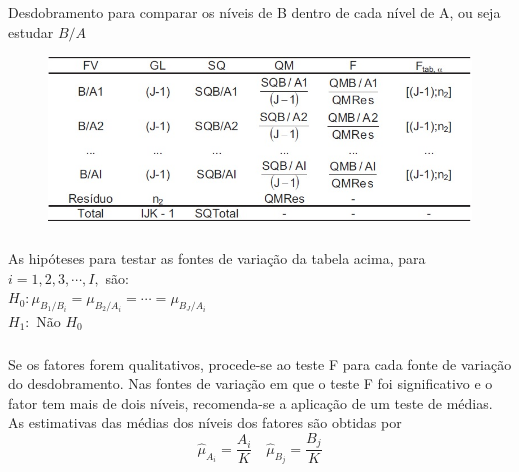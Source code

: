 \documentclass[14pt,aspectratio=1610]{beamer}
\begin{document}
\begin{frame}{}
\frametitle{}
\begin{block}{}
\justifying
Desdobramento para comparar os níveis de B dentro de cada nível de A,
ou seja estudar $B/A$
\begin{figure}[H]
    \centering
    \includegraphics[scale=0.5]{Figuras/B_dentro_A}
  \end{figure}
\end{block}
\end{frame}

\begin{frame}{}
\frametitle{}
\begin{block}{}
\justifying
As hipóteses para testar as fontes de variação da tabela acima, para 
$i=1,2,3,\cdots,I,$ são:\\

$H_{0}:\mu_{B_{1}/B_{i}}=\mu_{B_{2}/A_{i}}=\cdots=\mu_{B_{J}/A_{i}}$\\
$H_{1}:$ Não $H_{0}$

\end{block}
\end{frame}

\begin{frame}{}
\frametitle{}
\begin{block}{}
\justifying
Se os fatores forem qualitativos, procede-se ao teste F para cada fonte de
variação do desdobramento. Nas fontes de variação em que o teste F foi
significativo e o fator tem mais de dois níveis, recomenda-se a aplicação de um
teste de médias. As estimativas das médias dos níveis dos fatores são obtidas
por
$$\hat{\mu}_{A_{i}}=\dfrac{A_{i}}{K}\quad \hat{\mu}_{B_{j}}=\dfrac{B_{j}}{K}$$
\end{block}
\end{frame}
\end{document}
